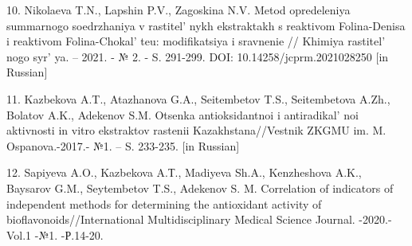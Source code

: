 \begin{references}
10. Nikolaeva T.N., Lapshin P.V., Zagoskina N.V. Metod opredeleniya
summarnogo soedrzhaniya v rastitel' nykh ekstraktakh s
reaktivom Folina-Denisa i reaktivom Folina-Chokal' teu:
modifikatsiya i sravnenie // Khimiya rastitel' nogo
syr' ya. -- 2021. - № 2. - S. 291-299. DOI:
10.14258/jcprm.2021028250 {[}in Russian{]}

11. Kazbekova A.T., Atazhanova G.A., Seitembetov T.S., Seitembetova A.Zh.,
Bolatov A.K., Adekenov S.M. Otsenka antioksidantnoi i
antiradikal' noi aktivnosti in vitro ekstraktov
rastenii Kazakhstana//Vestnik ZKGMU im. M. Ospanova.-2017.- №1. -- S.
233-235. {[}in Russian{]}

12. Sapiyeva A.O., Kazbekova A.Т., Madiyeva Sh.A., Kenzheshova A.K.,
Baysarov G.M., Seytembetov T.S., Adekenov S. M. Correlation of
indicators of independent methods for determining the antioxidant
activity of bioflavonoids//International Multidisciplinary Medical
Science Journal. -2020.-Vol.1 -№1. -Р.14-20.
\end{references}

